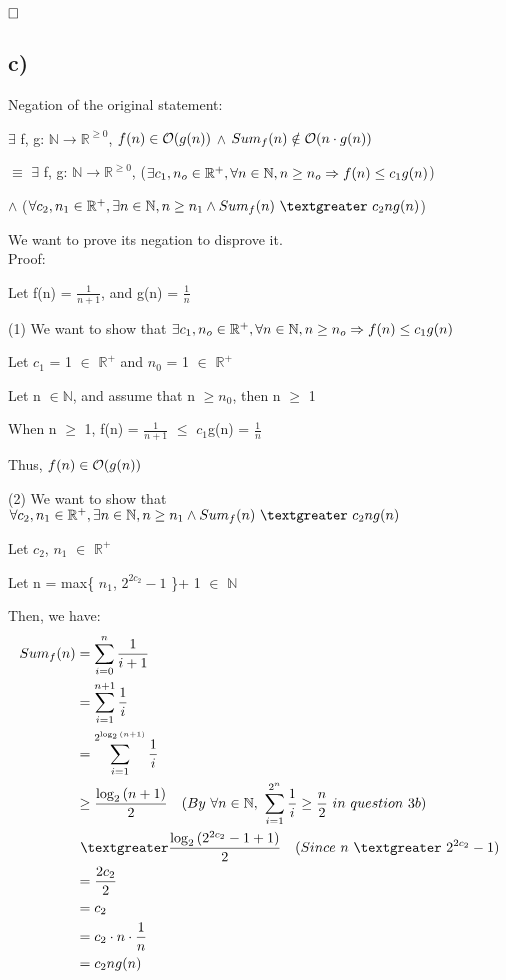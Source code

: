 \documentclass[12pt]{article}
\begin{document}
$\hfill\square$ 



\newpage

\vspace{20pt}
\subsection*{c)}
Negation of the original statement:

$\exists$ f, g: $\mathbb{N} \rightarrow \mathbb{R}^{\geq 0}$, $f(n) \in \mathcal O (g(n))$ $\wedge$ $Sum_{f}(n) \notin \mathcal O (n\cdot g(n))$ 

$\equiv$  $\exists$ f, g: $\mathbb{N} \rightarrow \mathbb{R}^{\geq 0}$, ($\exists c_{1}, n_{o} \in \mathbb{R}^{+}, \forall n \in \mathbb{N}, n \geq n_{o} \Rightarrow f(n) \leq c_{1}g(n)$)

$\wedge$ ($\forall c_{2}, n_{1} \in \mathbb{R}^{+}, \exists n \in \mathbb{N}, n \geq n_{1} \wedge Sum_{f}(n)\   \textgreater  \ c_{2}ng(n)$)

We want to prove its negation to disprove it. \\ 
Proof:

Let f(n) = $\frac{1}{n + 1}$, and g(n) = $\frac{1}{n}$

(1) We want to show that $\exists c_{1}, n_{o} \in \mathbb{R}^{+}, \forall n \in \mathbb{N}, n \geq n_{o} \Rightarrow f(n) \leq c_{1}g(n)$

Let $c_{1}$ = 1 $\in$ $\mathbb{R}^{+}$ and $n_{0}$ = 1 $\in$ $\mathbb{R}^{+}$

Let n $\in \mathbb{N}$, and assume that n $\geq n_{0}$, then n $\geq$ 1

When n $\geq$ 1, f(n) = $\frac{1}{n + 1}$ $\leq$ $c_{1}$g(n) = $\frac{1}{n}$

Thus, $f(n) \in \mathcal O (g(n))$

(2) We want to show that $\forall c_{2}, n_{1} \in \mathbb{R}^{+}, \exists n \in \mathbb{N}, n \geq n_{1} \wedge Sum_{f}(n)\   \textgreater  \ c_{2}ng(n)$

Let $c_{2}$, $n_{1}$ $\in$ $\mathbb{R}^{+}$

Let n = max\{ $n_{1}$, $2^{2c_{2}} - 1$ \}+ 1 $\in$ $\mathbb{N}$

Then, we have:
\begin{align*}
Sum_{f}(n) &= \sum_{i=0}^{n} \frac{1}{i+1} \\
&= \sum_{i=1}^{n+1} \frac{1}{i} \\
&= \sum_{i=1}^{2^{\log_{2}{(n+1)}}} \frac{1}{i} \\
&\geq \frac{\log_{2}{(n+1)}}{2} \quad (By \ \forall n \in \mathbb{N}, \  \sum_{i=1}^{2^n} \frac{1}{i} \geq \frac{n}{2} \ in  \ question \ 3b) \\
&\ \textgreater \frac{\log_{2}{(2^{2c_{2}}- 1+1)}}{2} \quad (Since \ n\ \textgreater \ 2^{2c_{2}} - 1) \\
&= \frac{2c_{2}}{2} \\
&= c_{2} \\
&= c_{2} \cdot n \cdot \frac{1}{n} \\
&= c_{2}ng(n)
\end{align*}
\end{document}
